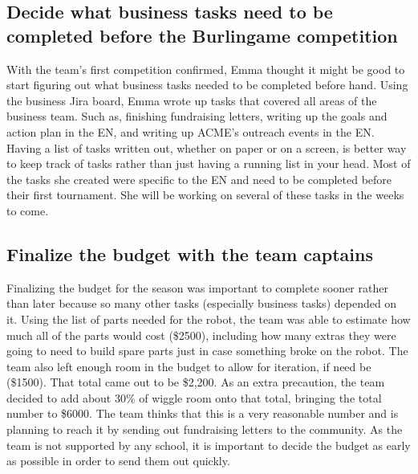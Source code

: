 \documentclass{article}
\newif\ifcontents
\begin{document}
\contentsfalse
\subsection{Decide what business tasks need to be completed before the Burlingame competition}
With the team's first competition confirmed, Emma thought it might be good to start figuring out what business tasks needed to be completed before hand. Using the business Jira board, Emma wrote up tasks that covered all areas of the business team. Such as, finishing fundraising letters, writing up the goals and action plan in the EN, and writing up ACME's outreach events in the EN. Having a list of tasks written out, whether on paper or on a screen, is better way to keep track of tasks rather than just having a running list in your head. Most of the tasks she created were specific to the EN and need to be completed before their first tournament. She will be working on several of these tasks in the weeks to come.

\subsection{Finalize the budget with the team captains}
Finalizing the budget for the season was important to complete sooner rather than later because so many other tasks (especially business tasks) depended on it. Using the list of parts needed for the robot, the team was able to estimate how much all of the parts would cost (\$2500), including how many extras they were going to need to build spare parts just in case something broke on the robot. The team also left enough room in the budget to allow for iteration, if need be (\$1500). That total came out to be \$2,200. As an extra precaution, the team decided to add about 30\% of wiggle room onto that total, bringing the total number to \$6000. The team thinks that this is a very reasonable number and is planning to reach it by sending out fundraising letters to the community. As the team is not supported by any school, it is important to decide the budget as early as possible in order to send them out quickly.
\end{document}
